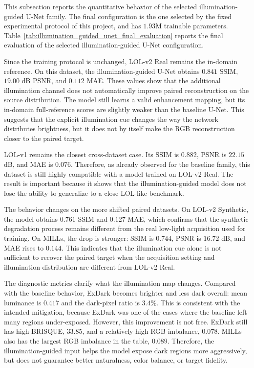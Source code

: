 This subsection reports the quantitative behavior of the selected illumination-guided U-Net family. The final configuration is the one selected by the fixed experimental protocol of this project, and has $1.93$M trainable parameters. Table~\ref{tab:illumination_guided_unet_final_evaluation} reports the final evaluation of the selected illumination-guided U-Net configuration.



Since the training protocol is unchanged, LOL-v2 Real remains the in-domain reference. On this dataset, the illumination-guided U-Net obtains $0.841$ SSIM, $19.00$ dB PSNR, and $0.112$ MAE. These values show that the additional illumination channel does not automatically improve paired reconstruction on the source distribution. The model still learns a valid enhancement mapping, but its in-domain full-reference scores are slightly weaker than the baseline U-Net. This suggests that the explicit illumination cue changes the way the network distributes brightness, but it does not by itself make the RGB reconstruction closer to the paired target.

LOL-v1 remains the closest cross-dataset case. Its SSIM is $0.882$, PSNR is $22.15$ dB, and MAE is $0.076$. Therefore, as already observed for the baseline family, this dataset is still highly compatible with a model trained on LOL-v2 Real. The result is important because it shows that the illumination-guided model does not lose the ability to generalize to a close LOL-like benchmark.

The behavior changes on the more shifted paired datasets. On LOL-v2 Synthetic, the model obtains $0.761$ SSIM and $0.127$ MAE, which confirms that the synthetic degradation process remains different from the real low-light acquisition used for training. On MILLs, the drop is stronger: SSIM is $0.744$, PSNR is $16.72$ dB, and MAE rises to $0.144$. This indicates that the illumination cue alone is not sufficient to recover the paired target when the acquisition setting and illumination distribution are different from LOL-v2 Real.

The diagnostic metrics clarify what the illumination map changes. Compared with the baseline behavior, ExDark becomes brighter and less dark overall: mean luminance is $0.417$ and the dark-pixel ratio is $3.4\%$. This is consistent with the intended mitigation, because ExDark was one of the cases where the baseline left many regions under-exposed. However, this improvement is not free. ExDark still has high BRISQUE, $33.85$, and a relatively high RGB imbalance, $0.078$. MILLs also has the largest RGB imbalance in the table, $0.089$. Therefore, the illumination-guided input helps the model expose dark regions more aggressively, but does not guarantee better naturalness, color balance, or target fidelity.

